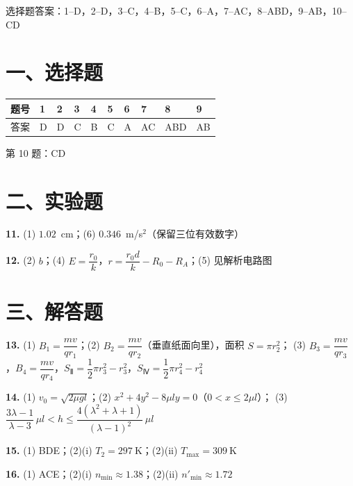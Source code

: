 
\begin{gknotice}
  选择题答案：1--D，2--D，3--C，4--B，5--C，6--A，7--AC，8--ABD，9--AB，10--CD
\end{gknotice}

\section*{一、选择题}

\noindent
\begin{tabular}{@{}llllllllll@{}}
\toprule
题号 & 1 & 2 & 3 & 4 & 5 & 6 & 7 & 8 & 9\\
\midrule
答案 & D & D & C & B & C & A & AC & ABD & AB\\
\bottomrule
\end{tabular}

\smallskip

\noindent
第 10 题：CD

\section*{二、实验题}

\noindent
\textbf{11.} (1) $1.02$~cm；\quad(6) $0.346$~m/s$^{2}$（保留三位有效数字）

\smallskip

\noindent
\textbf{12.} (2) $b$；\quad(4) $E=\dfrac{r_{0}}{k}$，$r=\dfrac{r_{0}d}{k}-R_{0}-R_{A}$；\quad(5) 见解析电路图

\section*{三、解答题}

\noindent
\textbf{13.} (1) $B_{1}=\dfrac{mv}{qr_{1}}$；\quad(2) $B_{2}=\dfrac{mv}{qr_{2}}$（垂直纸面向里），面积 $S=\pi r_{2}^{2}$；
\qquad(3) $B_{3}=\dfrac{mv}{qr_{3}}$，$B_{4}=\dfrac{mv}{qr_{4}}$，$S_{\text{Ⅱ}}=\dfrac{1}{2}\pi r_{3}^{2}-r_{3}^{2}$，$S_{\text{Ⅳ}}=\dfrac{1}{2}\pi r_{4}^{2}-r_{4}^{2}$

\smallskip

\noindent
\textbf{14.} (1) $v_{0}=\sqrt{2\mu gl}$；\quad(2) $x^{2}+4y^{2}-8\mu ly=0$（$0<x\le2\mu l$）；
\qquad(3) $\dfrac{3\lambda-1}{\lambda-3}\,\mu l<h\le\dfrac{4(\lambda^{2}+\lambda+1)}{(\lambda-1)^{2}}\,\mu l$

\smallskip

\noindent
\textbf{15.} (1) BDE；\quad(2)(i) $T_{2}=\SI{297}{\kelvin}$；\quad(2)(ii) $T_{\max}=\SI{309}{\kelvin}$

\smallskip

\noindent
\textbf{16.} (1) ACE；\quad(2)(i) $n_{\min}\approx1.38$；\quad(2)(ii) $n'_{\min}\approx1.72$
